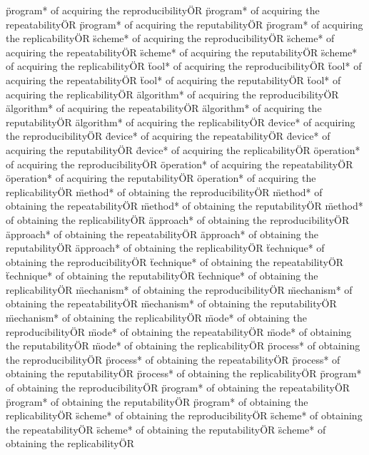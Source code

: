 \documentclass[
10pt, %
a4paper, %
oneside, %
headinclude,footinclude, %
BCOR5mm, %
]{scrartcl}
\begin{document}
\"program* of acquiring the reproducibility\" OR \"program* of acquiring the repeatability\" OR \"program* of acquiring the reputability\" OR \"program* of acquiring the replicability\" OR 
\"scheme* of acquiring the reproducibility\" OR \"scheme* of acquiring the repeatability\" OR \"scheme* of acquiring the reputability\" OR \"scheme* of acquiring the replicability\" OR 
\"tool* of acquiring the reproducibility\" OR \"tool* of acquiring the repeatability\" OR \"tool* of acquiring the reputability\" OR \"tool* of acquiring the replicability\" OR 
\"algorithm* of acquiring the reproducibility\" OR \"algorithm* of acquiring the repeatability\" OR \"algorithm* of acquiring the reputability\" OR \"algorithm* of acquiring the replicability\" OR 
\"device* of acquiring the reproducibility\" OR \"device* of acquiring the repeatability\" OR \"device* of acquiring the reputability\" OR \"device* of acquiring the replicability\" OR 
\"operation* of acquiring the reproducibility\" OR \"operation* of acquiring the repeatability\" OR \"operation* of acquiring the reputability\" OR \"operation* of acquiring the replicability\" OR 
\"method* of obtaining the reproducibility\" OR \"method* of obtaining the repeatability\" OR \"method* of obtaining the reputability\" OR \"method* of obtaining the replicability\" OR 
\"approach* of obtaining the reproducibility\" OR \"approach* of obtaining the repeatability\" OR \"approach* of obtaining the reputability\" OR \"approach* of obtaining the replicability\" OR 
\"technique* of obtaining the reproducibility\" OR \"technique* of obtaining the repeatability\" OR \"technique* of obtaining the reputability\" OR \"technique* of obtaining the replicability\" OR 
\"mechanism* of obtaining the reproducibility\" OR \"mechanism* of obtaining the repeatability\" OR \"mechanism* of obtaining the reputability\" OR \"mechanism* of obtaining the replicability\" OR 
\"mode* of obtaining the reproducibility\" OR \"mode* of obtaining the repeatability\" OR \"mode* of obtaining the reputability\" OR \"mode* of obtaining the replicability\" OR 
\"process* of obtaining the reproducibility\" OR \"process* of obtaining the repeatability\" OR \"process* of obtaining the reputability\" OR \"process* of obtaining the replicability\" OR 
\"program* of obtaining the reproducibility\" OR \"program* of obtaining the repeatability\" OR \"program* of obtaining the reputability\" OR \"program* of obtaining the replicability\" OR 
\"scheme* of obtaining the reproducibility\" OR \"scheme* of obtaining the repeatability\" OR \"scheme* of obtaining the reputability\" OR \"scheme* of obtaining the replicability\" OR 
\end{document}
